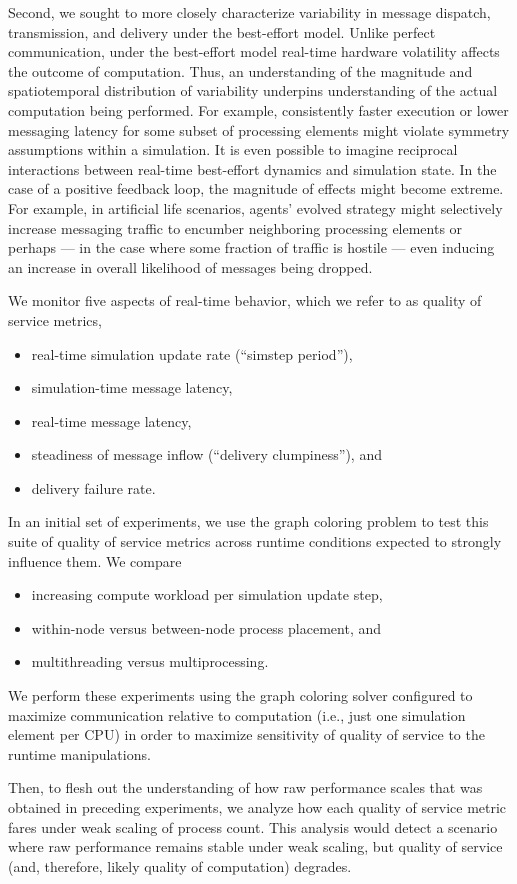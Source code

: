 Second, we sought to more closely characterize variability in message dispatch, transmission, and delivery under the best-effort model.
Unlike perfect communication, under the best-effort model real-time hardware volatility affects the outcome of computation.
Thus, an understanding of the magnitude and spatiotemporal distribution of variability underpins understanding of the actual computation being performed.
For example, consistently faster execution or lower messaging latency for some subset of processing elements might violate symmetry assumptions within a simulation.
It is even possible to imagine reciprocal interactions between real-time best-effort dynamics and simulation state.
In the case of a positive feedback loop, the magnitude of effects might become extreme.
For example, in artificial life scenarios, agents' evolved strategy might selectively increase messaging traffic to encumber neighboring processing elements or perhaps --- in the case where some fraction of traffic is hostile --- even inducing an increase in overall likelihood of messages being dropped.

We monitor five aspects of real-time behavior, which we refer to as quality of service metrics,
\begin{itemize}
  \item real-time simulation update rate (``simstep period''),
  \item simulation-time message latency,
  \item real-time message latency,
  \item steadiness of message inflow (``delivery clumpiness''), and
  \item delivery failure rate.
\end{itemize}

In an initial set of experiments, we use the graph coloring problem to test this suite of quality of service metrics across runtime conditions expected to strongly influence them.
We compare
\begin{itemize}
  \item increasing compute workload per simulation update step,
  \item within-node versus between-node process placement, and
  \item multithreading versus multiprocessing.
\end{itemize}
We perform these experiments using the graph coloring solver configured to maximize communication relative to computation (i.e., just one simulation element per CPU) in order to maximize sensitivity of quality of service to the runtime manipulations.

Then, to flesh out the understanding of how raw performance scales that was obtained in preceding experiments, we analyze how each quality of service metric fares under weak scaling of process count.
This analysis would detect a scenario where raw performance remains stable under weak scaling, but quality of service (and, therefore, likely quality of computation) degrades.
